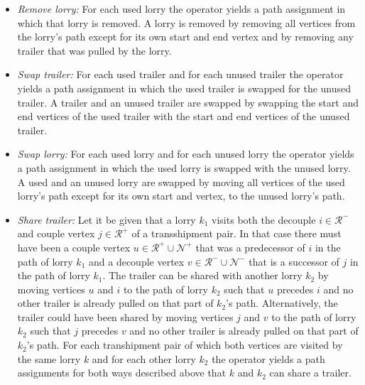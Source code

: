 \begin{itemize}
	\item \textit{Remove lorry:} For each used lorry the operator yields a path assignment in which that lorry is removed. A lorry is removed by removing all vertices from the lorry's path except for its own start and end vertex and by removing any trailer that was pulled by the lorry.

	\item \textit{Swap trailer:} For each used trailer and for each unused trailer the operator yields a path assignment in which the used trailer is swapped for the unused trailer. A trailer and an unused trailer are swapped by swapping the start and end vertices of the used trailer with the start and end vertices of the unused trailer.
	\item \textit{Swap lorry:} For each used lorry and for each unused lorry the operator  yields a path assignment in which the used lorry is swapped with the unused lorry. A used and an unused lorry are swapped by moving all vertices of the used lorry's path except for its own start and vertex, to the unused lorry's path.
	\item \textit{Share trailer:}
  Let it be given that a lorry $k_1$ visits both the decouple
  $i \in \mathcal R^- $
  and couple vertex
  $j \in \mathcal R^+ $
  of a transshipment pair.
  In that case there must have been a couple vertex
  $ u \in \mathcal R^+ \cup \mathcal N^+$
  that was a predecessor of $i$ in the path of lorry $k_1$ and a decouple vertex
  $ v \in \mathcal R^- \cup \mathcal N^-$
  that is a successor of $j$ in the path of lorry $k_1$.
  The trailer can be shared with another lorry $k_2$ by moving vertices $u$ and $i$ to the path of lorry $k_2$ such that $u$ precedes $i$ and no other trailer is already pulled on that part of $k_2$'s path.  Alternatively, the trailer could have been shared by moving vertices $j$ and $v$ to the path of lorry $k_2$ such that $j$ precedes $v$ and no other trailer is already pulled on that part of $k_2$'s path.
For each transhipment pair of which both vertices are visited by the same lorry $k$ and for each other lorry $k_2$  the operator yields a path assignments for both ways described above that $k$ and $k_2$ can share a trailer.


\end{itemize}
